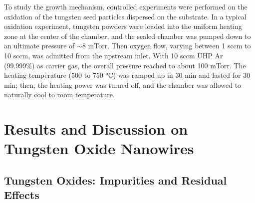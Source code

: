 To study the growth mechanism, controlled experiments were performed on the oxidation of the tungsten seed particles dispersed on the substrate. In a typical oxidation experiment, tungsten powders were loaded into the uniform heating zone at the center of the chamber, and the sealed chamber was pumped down to an ultimate pressure of $\sim8$ mTorr. Then oxygen flow, varying between 1 sccm to 10 sccm, was admitted from the upstream inlet. With 10 sccm UHP Ar (99.999\%) as carrier gas, the overall pressure reached to about 100 mTorr. The heating temperature (500 to 750 \si{\degreeCelsius}) was ramped up in 30 min and lasted for 30 min; then, the heating power was turned off, and the chamber was allowed to naturally cool to room temperature.

\section{Results and Discussion on Tungsten Oxide Nanowires}
\subsection{Tungsten Oxides: Impurities and Residual Effects}\label{sec:nawox}

